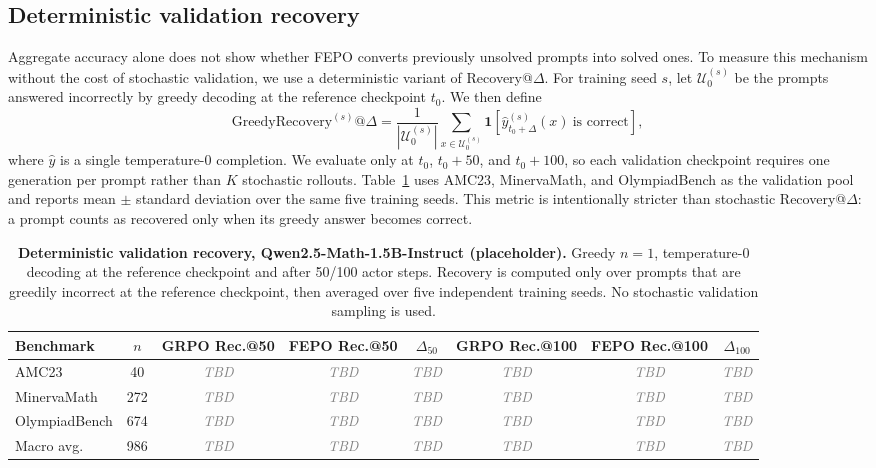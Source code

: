 \documentclass{article}
\newcommand{\TBD}{\textcolor{gray}{\textit{TBD}}}
\newcommand{\FEPO}{\textsc{FEPO}\xspace}
\begin{document}
\subsection{Deterministic validation recovery}
Aggregate accuracy alone does not show whether \FEPO converts previously unsolved prompts into solved ones. To measure this mechanism without the cost of stochastic validation, we use a deterministic variant of Recovery@$\Delta$. For training seed $s$, let $\mathcal U^{(s)}_0$ be the prompts answered incorrectly by greedy decoding at the reference checkpoint $t_0$. We then define
\begin{equation}
\mathrm{GreedyRecovery}^{(s)}@\Delta
=
\frac{1}{|\mathcal U^{(s)}_0|}
\sum_{x\in\mathcal U^{(s)}_0}
\mathbf 1\!\left[\hat y_{t_0+\Delta}^{(s)}(x)\ \text{is correct}\right],
\label{eq:greedy_recovery}
\end{equation}
where $\hat y$ is a single temperature-$0$ completion. We evaluate only at $t_0$, $t_0+50$, and $t_0+100$, so each validation checkpoint requires one generation per prompt rather than $K$ stochastic rollouts. Table~\ref{tab:greedy_recovery} uses AMC23, MinervaMath, and OlympiadBench as the validation pool and reports mean $\pm$ standard deviation over the same five training seeds. This metric is intentionally stricter than stochastic Recovery@$\Delta$: a prompt counts as recovered only when its greedy answer becomes correct.

\begin{table}[H]
\centering
\scriptsize
\setlength{\tabcolsep}{3.0pt}
\renewcommand{\arraystretch}{1.08}
\begin{tabular*}{\linewidth}{@{\extracolsep{\fill}}lccccccc@{}}
\toprule
Benchmark & $n$ & GRPO Rec.@50 & \FEPO Rec.@50 & $\Delta_{50}$ & GRPO Rec.@100 & \FEPO Rec.@100 & $\Delta_{100}$\\
\midrule
AMC23 & 40 & \TBD & \TBD & \TBD & \TBD & \TBD & \TBD\\
MinervaMath & 272 & \TBD & \TBD & \TBD & \TBD & \TBD & \TBD\\
OlympiadBench & 674 & \TBD & \TBD & \TBD & \TBD & \TBD & \TBD\\
\midrule
Macro avg. & 986 & \TBD & \TBD & \TBD & \TBD & \TBD & \TBD\\
\bottomrule
\end{tabular*}
\caption{\textbf{Deterministic validation recovery, Qwen2.5-Math-1.5B-Instruct (placeholder).} Greedy $n=1$, temperature-$0$ decoding at the reference checkpoint and after 50/100 actor steps. Recovery is computed only over prompts that are greedily incorrect at the reference checkpoint, then averaged over five independent training seeds. No stochastic validation sampling is used.}
\label{tab:greedy_recovery}
\end{table}
\end{document}
